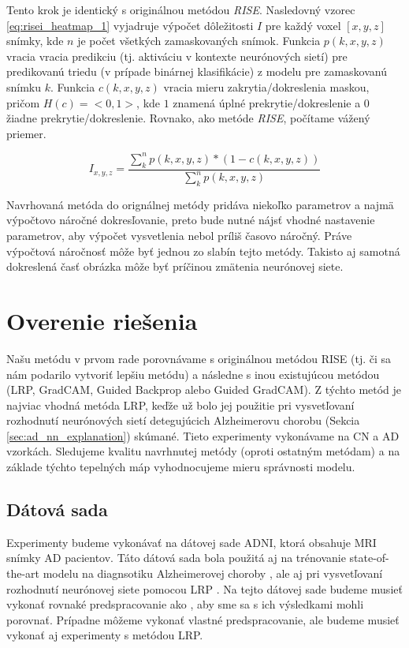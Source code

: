 Tento krok je identický s originálnou metódou \textit{RISE}. Nasledovný vzorec \ref{eq:risei_heatmap_1} vyjadruje výpočet dôležitosti $I$ pre každý voxel $[x, y, z]$ snímky, kde $n$ je počet všetkých zamaskovaných snímok. Funkcia $p(k, x, y, z)$ vracia vracia predikciu (tj. aktiváciu v kontexte neurónových sietí) pre predikovanú triedu (v prípade binárnej klasifikácie) z modelu pre zamaskovanú snímku $k$. Funkcia $c(k, x, y, z)$ vracia mieru zakrytia/dokreslenia maskou, pričom $H(c) = <0, 1>$, kde $1$ znamená úplné prekrytie/dokreslenie a $0$ žiadne prekrytie/dokreslenie. Rovnako, ako metóde \textit{RISE}, počítame vážený priemer.

\begin{equation} 
    I_{x, y, z} = \frac{\sum_{k}^{n} p(k, x, y, z) * (1 - c(k, x, y, z))}{\sum_{k}^{n} p(k, x, y, z)}
    \label{eq:risei_heatmap_1}
\end{equation}

Navrhovaná metóda do orignálnej metódy pridáva niekoľko parametrov a najmä výpočtovo náročné dokresľovanie, preto bude nutné nájsť vhodné nastavenie parametrov, aby výpočet vysvetlenia nebol príliš časovo náročný. Práve výpočtová náročnosť môže byť jednou zo slabín tejto metódy. Takisto aj samotná dokreslená časť obrázka môže byť príčinou zmätenia neurónovej siete.

\section{Overenie riešenia \label{sec:evaluation_design}}

Našu metódu v prvom rade porovnávame s originálnou metódou RISE (tj. či sa nám podarilo vytvoriť lepšiu metódu) a následne s inou existujúcou metódou (LRP, GradCAM, Guided Backprop alebo Guided GradCAM). Z týchto metód je najviac vhodná metóda LRP, keďže už bolo jej použitie pri vysvetľovaní rozhodnutí neurónových sietí detegujúcich Alzheimerovu chorobu (Sekcia \ref{sec:ad_nn_explanation}) skúmané. Tieto experimenty vykonávame na CN a AD vzorkách. Sledujeme kvalitu navrhnutej metódy (oproti ostatným metódam) a na základe týchto tepelných máp vyhodnocujeme mieru správnosti modelu.

\subsection{Dátová sada} Experimenty budeme vykonávať na dátovej sade ADNI, ktorá obsahuje MRI snímky AD pacientov. Táto dátová sada bola použitá aj na trénovanie state-of-the-art modelu na diagnsotiku Alzheimerovej choroby \cite{esmaeilzadeh2018end}, ale aj pri vysvetľovaní rozhodnutí neurónovej siete pomocou LRP \cite{bohle2019layer}. Na tejto dátovej sade budeme musieť vykonať rovnaké predspracovanie ako \citeauthor*{bohle2019layer}, aby sme sa s ich výsledkami mohli porovnať. Prípadne môžeme vykonať vlastné predspracovanie, ale budeme musieť vykonať aj experimenty s metódou LRP.

